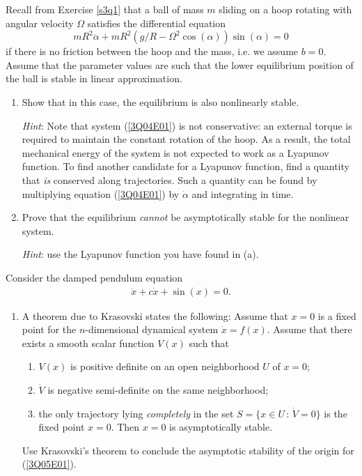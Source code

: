 \begin{exercise}
	Recall from Exercise \ref{s3q1} that a ball of mass $m$ sliding on a hoop rotating with angular velocity $\Omega$ satisfies the differential equation
\begin{equation}\label{3Q04E01}
	mR^2 \ddot{\alpha} + mR^2(g/R - \Omega^2 \cos(\alpha)) \sin(\alpha) = 0
\end{equation}
if there is no friction between the hoop and the mass, i.e. we assume $b=0$. 
 Assume that the parameter values are such that the lower equilibrium position of the ball is stable in linear approximation.

\begin{enumerate}[label=(\alph*)]
	\item Show that in this case, the equilibrium is also nonlinearly stable. 
	
	\textit{Hint}: Note that system (\ref{3Q04E01}) is not conservative: an external torque is required to maintain the constant rotation of the hoop. As a result, the total mechanical energy of the system is not expected to work as a Lyapunov function. To find another candidate for a Lyapunov function, find a quantity that \textit{is} conserved along trajectories. Such a quantity can be found by multiplying equation (\ref{3Q04E01}) by $\dot{\alpha}$ and integrating in time.
	\item Prove that the equilibrium \textit{cannot} be asymptotically stable for the nonlinear system.
	
	\textit{Hint}: use the Lyapunov function you have found in (a).
\end{enumerate}
\end{exercise}

\begin{exercise}
Consider the damped pendulum equation
\begin{align}\label{3Q05E01}
	\ddot{x} + c\dot{x} + \sin(x) = 0.
\end{align}

\begin{enumerate}[label=(\alph*)]
	\item A theorem due to Krasovski states the following: Assume that $x=0$ is a fixed point for the $n$-dimensional dynamical system $\dot{x}=f(x)$. Assume that there exists a smooth scalar function $V(x)$ such that
	\begin{enumerate}[label=(\roman*)]
		\item $V(x)$ is positive definite on an open neighborhood $U$ of $x=0$;
		\item $\dot{V}$ is negative semi-definite on the same neighborhood;
		\item the only trajectory lying \textit{completely} in the set $S= \{ x\in U \, : \, \dot{V}=0 \}$ is the fixed point $x=0$. Then $x=0$ is asymptotically stable.
	\end{enumerate}
	Use Krasovski's theorem to conclude the asymptotic stability of the origin for (\ref{3Q05E01}).
\end{enumerate}
\end{exercise}

